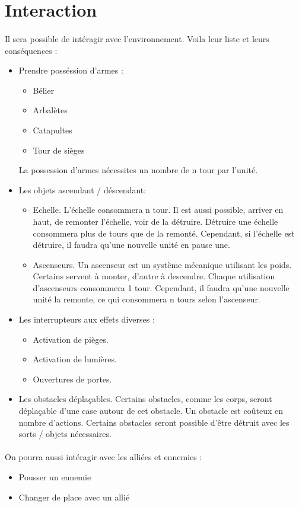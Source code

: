 \newpage
\section{Interaction}
\paragraph{} Il sera possible de intéragir avec l'environnement. Voila leur liste et leurs conséquences :

\begin{itemize}
	\item Prendre posséssion d'armes :
		\begin{itemize}
			\item Bélier
			\item Arbalètes
			\item Catapultes
			\item Tour de sièges
		\end{itemize}
	La possession d'armes nécessites un nombre de n tour par l'unité.
	\item Les objets ascendant / déscendant:
		\begin{itemize}
			\item Echelle. L'échelle consommera n tour. Il est aussi possible, arriver en haut, de remonter l'échelle, voir de la détruire. Détruire une échelle consommera plus de tours que de la remonté. Cependant, si l'échelle est détruire, il faudra qu'une nouvelle unité en pause une.
			\item Ascenseurs. Un ascenseur est un système mécanique utilisant les poids. Certains servent à monter, d'autre à descendre. Chaque utilisation d'ascenseurs consommera 1 tour. Cependant, il faudra qu'une nouvelle unité la remonte, ce qui consommera n tours selon l'ascenseur.
		\end{itemize}

	\item Les interrupteurs aux effets diverses :
		\begin{itemize}
			\item Activation de pièges.
			\item Activation de lumières.
			\item Ouvertures de portes.
		\end{itemize}

	\item Les obstacles déplaçables. Certains obstacles, comme les corps, seront déplaçable d'une case autour de cet obstacle. Un obstacle est coûteux en nombre d'actions.
	Certains obstacles seront possible d'être détruit avec les sorts / objets nécessaires.
\end{itemize}

\paragraph{} On pourra aussi intéragir avec les alliées et ennemies : 
\begin{itemize}
	\item Pousser un ennemie
	\item Changer de place avec un allié
\end{itemize}
